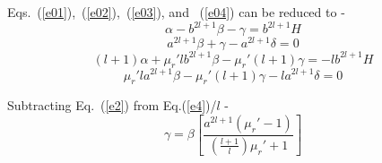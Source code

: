 

Eqs.~(\ref{e01}),~(\ref{e02}),~(\ref{e03}), and ~(\ref{e04}) can be reduced to -
\begin{equation}\label{e1}
\alpha- b^{2l+1}\beta-\gamma=b^{2l+1}H
\end{equation}
\begin{equation}\label{e2}
 a^{2l+1}\beta+\gamma-a^{2l+1}\delta =0
\end{equation}
\begin{equation}\label{e3}
(l+1)\alpha+\mu_r' l b^{2l+1}\beta-\mu_r'(l+1)\gamma=-lb^{2l+1}H
\end{equation}
\begin{equation}\label{e4}
\mu_r'l a^{2l+1}\beta -\mu_r'(l+1)\gamma- l a^{2l+1}\delta=0
\end{equation}

Subtracting Eq.~(\ref{e2}) from Eq.(\ref{e4})/$l$ -
\begin{equation}\label{g1}
\gamma=\beta \left[\frac{a^{2l+1}(\mu_r'-1)}{\left(\frac{l+1}{l}\right)\mu_r'+1}\right]
\end{equation}

